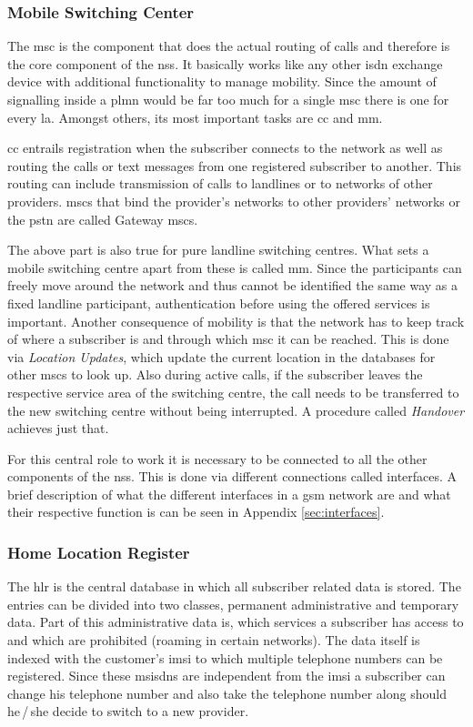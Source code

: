 \subsubsection{Mobile Switching Center}
The \gls{msc} is the component that does the actual routing of calls and therefore is the core component of the \gls{nss}.
It basically works like any other \gls{isdn} exchange device with additional functionality to manage mobility.
Since the amount of signalling inside a \gls{plmn} would be far too much for a single \gls{msc} there is one for every \gls{la}.
Amongst others, its most important tasks are \gls{cc} and \gls{mm}.

\gls{cc} entrails registration when the subscriber connects to the network as well as routing the calls or text messages from one registered subscriber to another. 
This routing can include transmission of calls to landlines or to networks of other providers.
\glspl{msc} that bind the provider's networks to other providers' networks or the \gls{pstn} are called Gateway \glspl{msc}.

The above part is also true for pure landline switching centres.
What sets a mobile switching centre apart from these is called \gls{mm}.
Since the participants can freely move around the network  and thus cannot be identified the same way as a fixed landline participant, authentication before using the offered services is important.
Another consequence of mobility is that the network has to keep track of where a subscriber is and through which \gls{msc} it can be reached.
This is done via  \emph{Location Updates}, which update the current location in the databases for other \glspl{msc} to look up.
Also during active calls, if the subscriber leaves the respective service area of the switching centre, the call needs to be transferred to the new switching centre without being interrupted.
A procedure called \emph{Handover} achieves just that.

For this central role to work it is necessary to be connected to all the other components of the \gls{nss}.
This is done via different connections called interfaces.
A brief description of what the different interfaces in a \gls{gsm} network are and what their respective function is can be seen in Appendix \ref{sec:interfaces}.

\subsubsection{Home Location Register}
The \gls{hlr} is the central database in which all subscriber related data is stored.
The entries can be divided into two classes, permanent administrative and temporary data.
Part of this administrative data is, which services a subscriber has access to and which are prohibited (\eg roaming in certain networks).
The data itself is indexed with the customer's \gls{imsi} to which multiple telephone numbers can be registered.
Since these \glspl{msisdn} are independent from the \gls{imsi} a subscriber can change his telephone number and also take the telephone number along should he\,/\,she decide to switch to a new provider.

